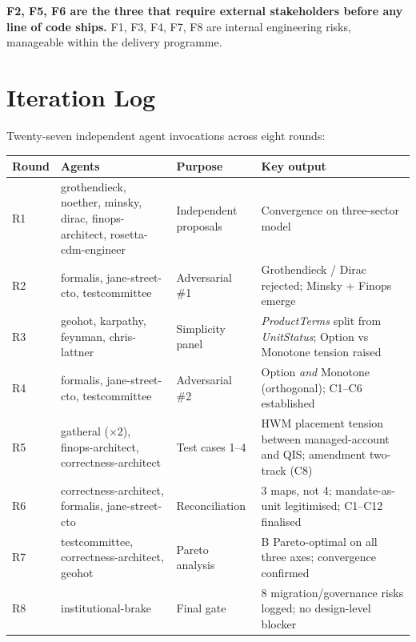 \documentclass[11pt,a4paper]{article}
\begin{document}
\noindent \textbf{F2, F5, F6 are the three that require external stakeholders before any line of code ships.} F1, F3, F4, F7, F8 are internal engineering risks, manageable within the delivery programme.

\section{Iteration Log}
\label{sec:iterationlog}

Twenty-seven independent agent invocations across eight rounds:

\begin{longtable}{p{0.8cm}p{5cm}p{3.5cm}p{5cm}}
\toprule
\textbf{Round} & \textbf{Agents} & \textbf{Purpose} & \textbf{Key output} \\
\midrule
R1 & grothendieck, noether, minsky, dirac, finops-architect, rosetta-cdm-engineer & Independent proposals & Convergence on three-sector model \\
\addlinespace
R2 & formalis, jane-street-cto, testcommittee & Adversarial \#1 & Grothendieck / Dirac rejected; Minsky + Finops emerge \\
\addlinespace
R3 & geohot, karpathy, feynman, chris-lattner & Simplicity panel & \textit{ProductTerms} split from \textit{UnitStatus}; Option vs Monotone tension raised \\
\addlinespace
R4 & formalis, jane-street-cto, testcommittee & Adversarial \#2 & Option \emph{and} Monotone (orthogonal); C1--C6 established \\
\addlinespace
R5 & gatheral ($\times$2), finops-architect, correctness-architect & Test cases 1--4 & HWM placement tension between managed-account and QIS; amendment two-track (C8) \\
\addlinespace
R6 & correctness-architect, formalis, jane-street-cto & Reconciliation & 3 maps, not 4; mandate-as-unit legitimised; C1--C12 finalised \\
\addlinespace
R7 & testcommittee, correctness-architect, geohot & Pareto analysis & B Pareto-optimal on all three axes; convergence confirmed \\
\addlinespace
R8 & institutional-brake & Final gate & 8 migration/governance risks logged; no design-level blocker \\
\bottomrule
\end{longtable}
\end{document}
